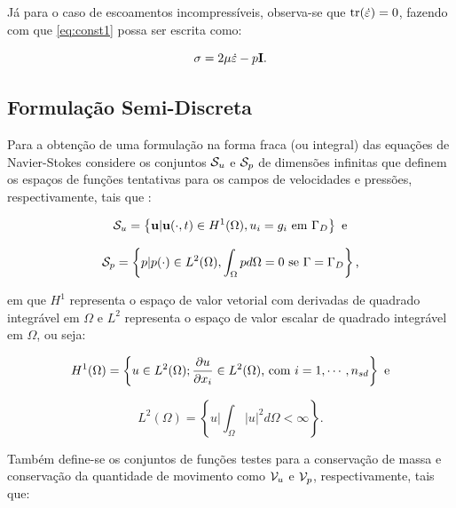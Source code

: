 \documentclass[_ArquivoPrincipal.tex]{subfiles}
\begin{document}
Já para o caso de escoamentos incompressíveis, observa-se que $\mathop{\mathrm{tr}}\nolimits(\dot{\mathbf{\varepsilon}})=0$, fazendo com que \ref{eq:const1} possa ser escrita como:

\begin{equation}
    \mathbf{\sigma}=2\mu\dot{\mathbf{\varepsilon}}-p\mathbf{I}\text{.}\label{eq:ModConst}
\end{equation}

\subsection{Formulação Semi-Discreta} \label{FSD}

Para a obtenção de uma formulação na forma fraca (ou integral) das equações de Navier-Stokes considere os conjuntos $\mathcal{S}_u$ e $\mathcal{S}_p$ de dimensões infinitas que definem os espaços de funções tentativas para os campos de velocidades e pressões, respectivamente, tais que \cite{bazilevs2013computational,fernandes2020tecnica}:

\begin{equation}
    \mathcal{S}_u=\left\{\mathbf{u}|\mathbf{u}(\cdot,t)\in H^1(\Omega),u_i=g_i\text{ em }\Gamma_D\right\}\text{ e}
\end{equation}

\begin{equation}
    \mathcal{S}_p=\left\{p|p(\cdot)\in L^2(\Omega),\int_\Omega{pd\Omega}=0\text{ se }\Gamma=\Gamma_D\right\}\text{,}
\end{equation}

\noindent em que $H^1$ representa o espaço de valor vetorial com derivadas de quadrado integrável em $\Omega$ e $L^2$ representa o espaço de valor escalar de quadrado integrável em $\Omega$, ou seja:

\begin{equation}
    H^1(\Omega)=\left\{u\in L^2(\Omega);\frac{\partial{u}}{\partial{x_i}}\in L^2(\Omega)\text{, com }i=1,\cdots,n_{sd}\right\}\text{ e}
\end{equation}

\begin{equation}
    L^2(\Omega)=\left\{u|\int_\Omega{|u|^2d\Omega}<\infty\right\}\text{.}
\end{equation}

Também define-se os conjuntos de funções testes para a conservação de massa e conservação da quantidade de movimento como $\mathcal{V}_u$ e $\mathcal{V}_p$, respectivamente, tais que:
\end{document}
